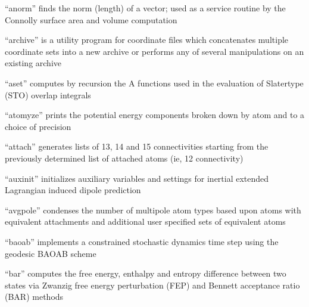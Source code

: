 \documentclass[letterpaper,11pt,english]{sphinxmanual}
\begin{document}

“anorm” finds the norm (length) of a vector; used as a
service routine by the Connolly surface area and volume
computation







“archive” is a utility program for coordinate files which
concatenates multiple coordinate sets into a new archive or
performs any of several manipulations on an existing archive


“aset” computes by recursion the A functions used in the
evaluation of Slater\sphinxhyphen{}type (STO) overlap integrals


“atomyze” prints the potential energy components broken
down by atom and to a choice of precision


“attach” generates lists of 1\sphinxhyphen{}3, 1\sphinxhyphen{}4 and 1\sphinxhyphen{}5 connectivities
starting from the previously determined list of attached
atoms (ie, 1\sphinxhyphen{}2 connectivity)


“auxinit” initializes auxiliary variables and settings for
inertial extended Lagrangian induced dipole prediction


“avgpole” condenses the number of multipole atom types based
upon atoms with equivalent attachments and additional user
specified sets of equivalent atoms


“baoab” implements a constrained stochastic dynamics time
step using the geodesic BAOAB scheme


“bar” computes the free energy, enthalpy and entropy difference
between two states via Zwanzig free energy perturbation (FEP)
and Bennett acceptance ratio (BAR) methods
\end{document}
